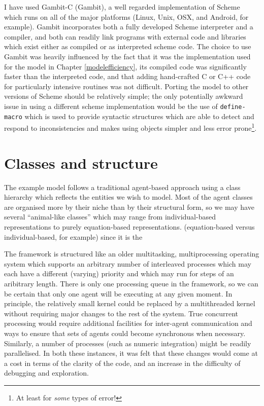 I have used Gambit-C (Gambit), a well regarded implementation of
Scheme which runs on all of the major platforms (Linux, Unix, OSX, and
Android, for example). Gambit incorporates both a fully developed
Scheme interpreter and a compiler, and both can readily link programs
with external code and libraries which exist either as compiled or as
interpreted scheme code. The choice to use Gambit was heavily
influenced by the fact that it was the implementation used for the
model in Chapter \ref{modelefficiency}, its compiled code was
significantly faster than the interpreted code, and that adding
hand-crafted C or C++ code for particularly intensive routines was not
difficult.  Porting the model to other versions of Scheme should be
relatively simple; the only potentially awkward issue in using a
different scheme implementation would be the use of
\texttt{define-macro} which is used to provide syntactic structures
which are able to detect and respond to inconsistencies and
makes using objects simpler and less error prone\footnote{At least for
  \emph{some} types of error!}.

\section{Classes and structure}

The example model follows a traditional agent-based approach using a
class hierarchy which reflects the entities we wish to model. Most of
the agent classes are organised more by their niche than by their
structural form, so we may have several ``animal-like classes'' which
may range from individual-based representations to purely
equation-based representations.  (equation-based versus
individual-based, for example) since it is the

The framework is structured like an older multitasking,
multiprocessing operating system which supports an arbitrary number of
interleaved processes which may each have a different (varying)
priority and which may run for steps of an aribitrary length. There is
only one processing queue in the framework, so we can be certain that
only one agent will be executing at any given moment.  In principle,
the relatively small kernel could be replaced by a multithreaded
kernel without requiring major changes to the rest of the system. True
concurrent processing would require additional facilities for
inter-agent communication and ways to ensure that sets of agents could
become synchronous when necessary. Similarly, a number of processes
(such as numeric integration) might be readily parallelised.  In both
these instances, it was felt that these changes would come at a cost
in terms of the clarity of the code, and an increase in the difficulty
of debugging and exploration.

